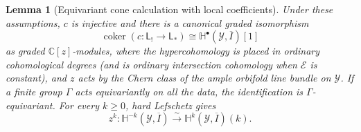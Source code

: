 \documentclass[11pt]{amsart}
\newtheorem{lemma}[theorem]{Lemma}
\theoremstyle{definition}
\theoremstyle{remark}
\begin{document}
\begin{lemma}[Equivariant cone calculation with local coefficients]\label{lem:cone-calculation}
Under these assumptions, $c$ is injective and there is a canonical graded
isomorphism
\[
 \operatorname{coker}(c:\mathsf L_!\to\mathsf L_*)
 \cong \mathbb H^\bullet(\mathcal Y,\overline I)[1]
\]
as graded $\mathbb C[z]$-modules, where the hypercohomology is placed in
ordinary cohomological degrees (and is ordinary intersection cohomology when
$\mathcal E$ is constant), and $z$ acts
by the Chern class of the ample orbifold line bundle on $\mathcal Y$.
If a finite group $\Gamma$ acts equivariantly on all the data, the
identification is $\Gamma$-equivariant.  For every $k\geq0$, hard Lefschetz
gives
\[
 z^k:\mathbb H^{-k}(\mathcal Y,\overline I)
 \xrightarrow{\sim}
 \mathbb H^k(\mathcal Y,\overline I)(k).
\]
\end{lemma}
\end{document}
